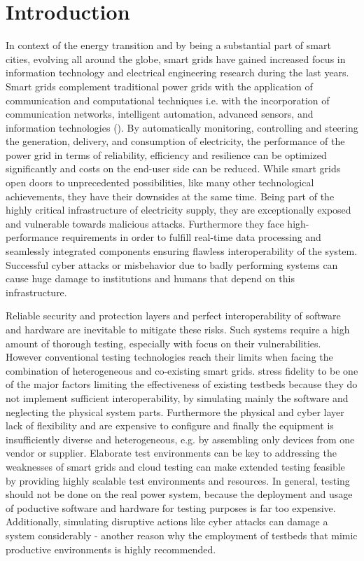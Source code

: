\section{Introduction}
In context of the energy transition and by being a substantial part of smart cities, evolving all around the globe, smart grids have gained increased focus in information technology and electrical engineering research during the last years. Smart grids complement traditional power grids with the application of communication and computational techniques \cite{talaat2020hybrid} i.e. with the incorporation of communication networks, intelligent automation, advanced sensors, and information technologies (\cite{smadi2021comprehensive}). By automatically monitoring, controlling and steering the generation, delivery, and consumption of electricity, the performance of the power grid in terms of reliability, efficiency and resilience can be optimized significantly and costs on the end-user side can be reduced. While smart grids open doors to unprecedented possibilities, like many other technological achievements, they have their downsides at the same time. Being part of the highly critical infrastructure of electricity supply, they are exceptionally exposed and vulnerable towards malicious attacks. Furthermore they face high-performance requirements in order to fulfill real-time data processing and seamlessly integrated components ensuring flawless interoperability of the system. Successful cyber attacks or misbehavior due to badly performing systems can cause huge damage to institutions and humans that depend on this infrastructure.

Reliable security and protection layers and perfect interoperability of software and hardware are inevitable to mitigate these risks. Such systems require a high amount of thorough testing, especially with focus on their vulnerabilities. However conventional testing technologies reach their limits when facing the combination of heterogeneous and co-existing smart grids. \citeauthor{smadi2021comprehensive} stress fidelity to be one of the major factors limiting the effectiveness of existing testbeds because they do not implement sufficient interoperability, by simulating mainly the software and neglecting the physical system parts. Furthermore the physical and cyber layer lack of flexibility and are expensive to configure and finally the equipment is insufficiently diverse and heterogeneous, e.g. by assembling only devices from one vendor or supplier. Elaborate test environments can be key to addressing the weaknesses of smart grids and cloud testing can make extended testing feasible by providing highly scalable test environments and resources. In general, testing should not be done on the real power system, because the deployment and usage of poductive software and hardware for testing purposes is far too expensive. Additionally, simulating disruptive actions like cyber attacks can damage a system considerably - another reason why the employment of testbeds that mimic productive environments is highly recommended.

